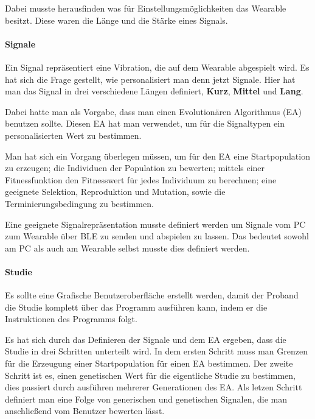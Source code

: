 Dabei musste herausfinden was f{\"u}r Einstellungsm{\"o}glichkeiten das Wearable besitzt. Diese waren die L{\"a}nge und die St{\"a}rke eines Signals.

\paragraph{Signale}

Ein Signal repr{\"a}sentiert eine Vibration, die auf dem Wearable abgespielt wird. Es hat sich die Frage gestellt, wie personalisiert man denn jetzt Signale. Hier hat man das Signal in drei verschiedene L{\"a}ngen definiert, \textbf{Kurz}, \textbf{Mittel} und \textbf{Lang}. 

Dabei hatte man als Vorgabe, dass man einen Evolution{\"a}ren Algorithmus (EA) benutzen sollte.
Diesen EA hat man verwendet, um f{\"u}r die Signaltypen ein personalisierten Wert zu bestimmen.

Man hat sich ein Vorgang {\"u}berlegen m{\"u}ssen, um f{\"u}r den EA eine Startpopulation zu erzeugen; die Individuen der Population zu bewerten; mittels einer Fitnessfunktion den Fitnesswert f{\"u}r jedes Individuum zu berechnen; eine geeignete Selektion, Reproduktion und Mutation, sowie die Terminierungsbedingung zu bestimmen. 

Eine geeignete Signalrepr{\"a}sentation musste definiert werden um Signale vom PC zum Wearable {\"u}ber BLE zu senden und abspielen zu lassen. Das bedeutet sowohl am PC als auch am Wearable selbst musste dies definiert werden.

\paragraph{Studie}

Es sollte eine Grafische Benutzeroberfl{\"a}che erstellt werden, damit der Proband die Studie komplett {\"u}ber das Programm ausf{\"u}hren kann, indem er die Instruktionen des Programms folgt.

Es hat sich durch das Definieren der Signale und dem EA ergeben, dass die Studie in drei Schritten unterteilt wird. 
In dem ersten Schritt muss man Grenzen f{\"u}r die Erzeugung einer Startpopulation f{\"u}r einen EA bestimmen.
Der zweite Schritt ist es, einen genetischen Wert f{\"u}r die eigentliche Studie zu bestimmen, dies passiert durch ausf{\"u}hren mehrerer Generationen des EA. 
Als letzen Schritt definiert man eine Folge von generischen und genetischen Signalen, die man anschlie{\ss}end vom Benutzer bewerten l{\"a}sst.

